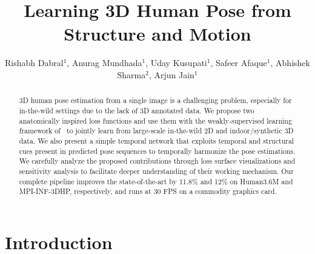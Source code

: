 \documentclass[runningheads]{llncs}
\begin{document}
\pagestyle{headings}
\mainmatter
\def\ECCV18SubNumber{***}  %
\title{Learning 3D Human Pose from Structure and Motion}

\titlerunning{ }

\authorrunning{ }

\author{Rishabh Dabral$^1$, Anurag Mundhada$^1$, Uday Kusupati$^1$, Safeer Afaque$^1$, Abhishek Sharma$^2$, Arjun Jain$^1$}


\maketitle

\begin{abstract}
3D human pose estimation from a single image is a challenging problem, especially for in-the-wild settings due to the lack of 3D annotated data. We propose two anatomically inspired loss functions and use them with the weakly-supervised learning framework of~\cite{Zhou_2017_ICCV} to jointly learn from large-scale in-the-wild 2D and indoor/synthetic 3D data. We also present a simple temporal network that exploits temporal and structural cues present in predicted pose sequences to temporally harmonize the pose estimations. We carefully analyze the proposed contributions through loss surface visualizations and sensitivity analysis to facilitate deeper understanding of their working mechanism. Our complete pipeline improves the state-of-the-art by 11.8\% and 12\% on Human3.6M and MPI-INF-3DHP, respectively, and runs at 30 FPS on a commodity graphics card. 

\end{abstract}
\vspace{-2em}
\section{Introduction}
\end{document}
